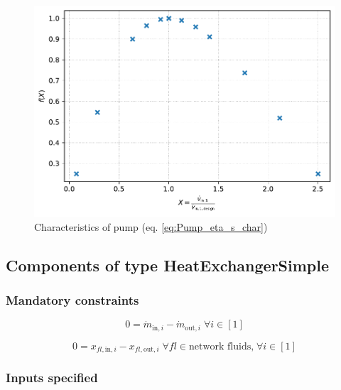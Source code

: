 \begin{minipage}{0.5\textwidth}
\begin{figure}[H]\begin{center}
\includegraphics[width=\textwidth]{figures/Pump_CharLine_eta_s_char_pump.pdf}
\caption{Characteristics of pump (eq. \ref{eq:Pump_eta_s_char})}
\label{fig:CharLine_eta_s_char_pump}
\end{center}\end{figure}

\end{minipage}

\subsection{Components of type HeatExchangerSimple}

\subsubsection{Mandatory constraints}

\begin{equation}
\label{eq:HeatExchangerSimple_mass_flow_constraints}
0=\dot{m}_{\mathrm{in,}i}-\dot{m}_{\mathrm{out,}i}\; \forall i \in [1]
\end{equation}

\begin{equation}
\label{eq:HeatExchangerSimple_fluid_constraints}
0=x_{fl\mathrm{,in,}i}-x_{fl\mathrm{,out,}i}\;\forall fl \in\text{network fluids,}\; \forall i \in [1]
\end{equation}


\subsubsection{Inputs specified}

